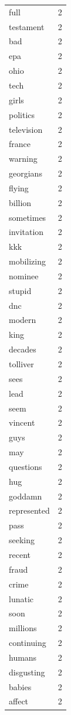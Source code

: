 \begin{tabular}{lr}
full & 2 \\
testament & 2 \\
bad & 2 \\
epa & 2 \\
ohio & 2 \\
tech & 2 \\
girls & 2 \\
politics & 2 \\
television & 2 \\
france & 2 \\
warning & 2 \\
georgians & 2 \\
flying & 2 \\
billion & 2 \\
sometimes & 2 \\
invitation & 2 \\
kkk & 2 \\
mobilizing & 2 \\
nominee & 2 \\
stupid & 2 \\
dnc & 2 \\
modern & 2 \\
king & 2 \\
decades & 2 \\
tolliver & 2 \\
sees & 2 \\
lead & 2 \\
seem & 2 \\
vincent & 2 \\
guys & 2 \\
may & 2 \\
questions & 2 \\
hug & 2 \\
goddamn & 2 \\
represented & 2 \\
pass & 2 \\
seeking & 2 \\
recent & 2 \\
fraud & 2 \\
crime & 2 \\
lunatic & 2 \\
soon & 2 \\
millions & 2 \\
continuing & 2 \\
humans & 2 \\
disgusting & 2 \\
babies & 2 \\
affect & 2 \\

\end{tabular}
